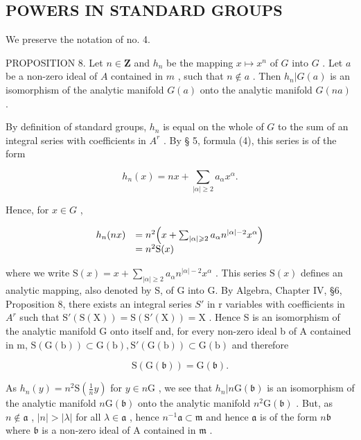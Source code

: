\subsection{POWERS IN STANDARD GROUPS}

We preserve the notation of no. 4.

PROPOSITION 8. Let \(n \in \mathbf{Z}\) and \(h_n\) be the mapping \(x \mapsto x^n\) of \(G\) into \(G\) . Let \(a\) be a non-zero ideal of \(A\) contained in \(m\) , such that \(n \notin a\) . Then \(h_n|G(a)\) is an isomorphism of the analytic manifold \(G(a)\) onto the analytic manifold \(G(na)\) .

By definition of standard groups, \(h_n\) is equal on the whole of \(G\) to the sum of an integral series with coefficients in \(A^r\) . By § 5, formula (4), this series is of the form

\[
h _ {n} (x) = n x + \sum_ {| \alpha | \geqslant 2} a _ {\alpha} x ^ {\alpha}.
\]

Hence, for \(x \in G\) ,

\[
\begin{array}{r l} h _ {n} (n x) & = n ^ {2} \Big (x + \sum_ {| \alpha | \geqslant 2} a _ {\alpha} n ^ {| \alpha | - 2} x ^ {\alpha} \Big) \\ & = n ^ {2} \mathrm{S} (x) \end{array}
\]

where we write \(\mathrm{S}(x)=x+\sum_{|\alpha| \geq 2} a_{\alpha} n^{|\alpha|-2} x^{\alpha}\) . This series \(\mathrm{S}(x)\) defines an analytic mapping, also denoted by S, of G into G. By Algebra, Chapter IV, §6, Proposition 8, there exists an integral series \(S'\) in r variables with coefficients in \(A^r\) such that \(\mathrm{S}'(\mathrm{S}(\mathrm{X}))=\mathrm{S}(\mathrm{S}'(\mathrm{X}))=\mathrm{X}\) . Hence S is an isomorphism of the analytic manifold G onto itself and, for every non-zero ideal b of A contained in m, \(\mathrm{S}(\mathrm{G}(\mathrm{b}))\subset\mathrm{G}(\mathrm{b}),\mathrm{S}'(\mathrm{G}(\mathrm{b}))\subset\mathrm{G}(\mathrm{b})\) and therefore

\[
\mathrm{S} (\mathrm{G} (\mathfrak {b})) = \mathrm{G} (\mathfrak {b}).
\]

As \(h_n(y) = n^2\mathrm{S}\left(\frac{1}{n} y\right)\) for \(y \in n\mathrm{G}\) , we see that \(h_n|n\mathrm{G}(\mathfrak{b})\) is an isomorphism of the analytic manifold \(n\mathrm{G}(\mathfrak{b})\) onto the analytic manifold \(n^2\mathrm{G}(\mathfrak{b})\) . But, as \(n \notin \mathfrak{a}\) , \(|n| > |\lambda|\) for all \(\lambda \in \mathfrak{a}\) , hence \(n^{-1}\mathfrak{a} \subset \mathfrak{m}\) and hence \(\mathfrak{a}\) is of the form \(n\mathfrak{b}\) where \(\mathfrak{b}\) is a non-zero ideal of \(\mathrm{A}\) contained in \(\mathfrak{m}\) .

